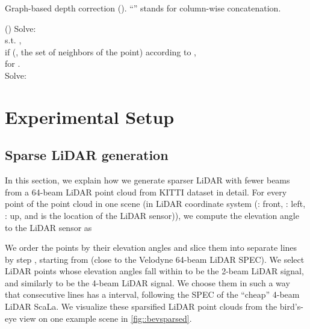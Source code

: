\begin{algorithm*}
	\caption{Graph-based depth correction (\GDC). ``'' stands for column-wise concatenation. \label{alg::GDC}}
	\SetAlgoLined
	\Begin(){
		Solve: \\
		\hspace{2.55em} s.t. \hspace{0.7em} ,\\
		\hspace{5em}  if  (\ie, the set of neighbors of the  point) according to ,\\
		\hspace{5em}  for .\\
		Solve: \\
		\Return 
	}
\end{algorithm*}

\section{Experimental Setup}
\label{ssec:ES}
\subsection{Sparse LiDAR generation}
\label{ssec:sparse}
In this section, we explain how we generate sparser LiDAR with fewer beams from a 64-beam LiDAR point cloud from KITTI dataset in detail. For every point  of the point cloud in one scene (in LiDAR coordinate system (: front, : left, : up, and  is the location of the LiDAR sensor)), we compute the elevation angle  to the LiDAR sensor as

We order the points by their elevation angles and slice them into separate lines by step , starting from  (close to the Velodyne 64-beam LiDAR SPEC). We select LiDAR points whose elevation angles fall within  to be the 2-beam LiDAR signal, and similarly  to be the 4-beam LiDAR signal. We choose them in such a way that consecutive lines has a  interval, following the SPEC of the ``cheap'' 4-beam LiDAR ScaLa.  We visualize these sparsified LiDAR point clouds from the bird's-eye view on one example scene in \autoref{fig::bevsparsed}.


